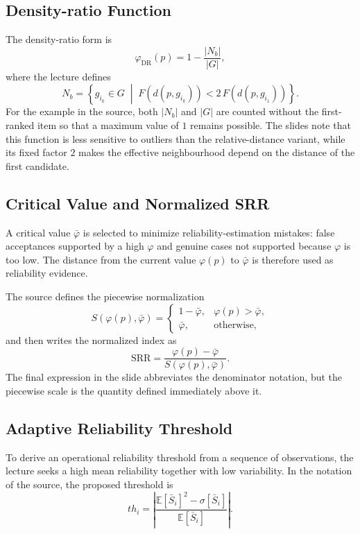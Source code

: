 \documentclass[11pt,a4paper,oneside]{report}
\begin{document}
\subsection{Density-ratio Function}

The density-ratio form is
\[
    \varphi_{\mathrm{DR}}(p)=1-\frac{|N_b|}{|G|},
\]
where the lecture defines
\[
N_b=\left\{g_{i_k}\in G\;\middle|\;
F(d(p,g_{i_k}))<2\,F(d(p,g_{i_1}))\right\}.
\]
For the example in the source, both $|N_b|$ and $|G|$ are counted without the
first-ranked item so that a maximum value of $1$ remains possible.  The slides
note that this function is less sensitive to outliers than the relative-distance
variant, while its fixed factor $2$ makes the effective neighbourhood depend on
the distance of the first candidate.

\subsection{Critical Value and Normalized SRR}

A critical value $\bar{\varphi}$ is selected to minimize reliability-estimation
mistakes: false acceptances supported by a high $\varphi$ and genuine cases not
supported because $\varphi$ is too low.  The distance from the current value
$\varphi(p)$ to $\bar{\varphi}$ is therefore used as reliability evidence.

The source defines the piecewise normalization
\[
S(\varphi(p),\bar{\varphi})=
\begin{cases}
1-\bar{\varphi}, & \varphi(p)>\bar{\varphi},\\
\bar{\varphi},   & \text{otherwise},
\end{cases}
\]
and then writes the normalized index as
\[
    \mathrm{SRR}=
    \frac{\varphi(p)-\bar{\varphi}}
         {S(\varphi(p),\bar{\varphi})}.
\]
The final expression in the slide abbreviates the denominator notation, but the
piecewise scale is the quantity defined immediately above it.

\subsection{Adaptive Reliability Threshold}

To derive an operational reliability threshold from a sequence of observations,
the lecture seeks a high mean reliability together with low variability.  In the
notation of the source, the proposed threshold is
\[
    th_i=
    \left|
    \frac{\mathbb{E}[\bar{S}_i]^2-\sigma[\bar{S}_i]}
         {\mathbb{E}[\bar{S}_i]}
    \right|.
\]
\end{document}
